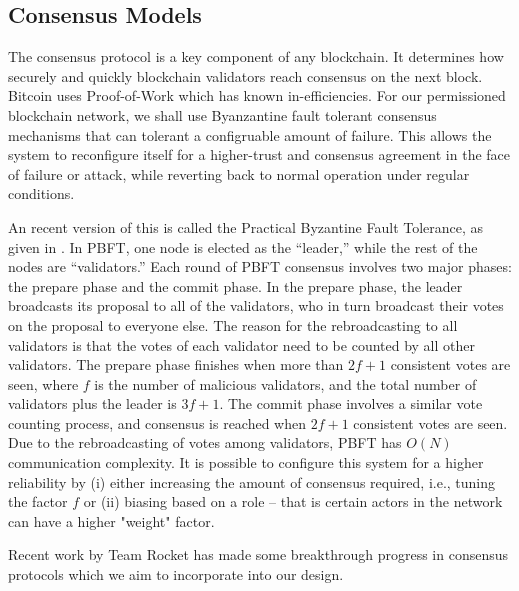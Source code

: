 \subsection{Consensus Models}

The consensus protocol is a key component of any blockchain. It determines how securely and
quickly blockchain validators reach consensus on the next block. Bitcoin uses Proof-of-Work which
has known in-efficiencies. For our permissioned blockchain network, we shall use Byanzantine fault tolerant 
consensus mechanisms that can tolerant a configruable amount of failure. This allows the system
to reconfigure itself for a higher-trust and consensus agreement in the face of failure or attack, while
reverting back to normal operation under regular conditions.

An recent version of this is called the Practical Byzantine Fault Tolerance, as given in \cite{castro1999}. In PBFT, one
node is elected as the “leader,” while the rest of the nodes are “validators.” Each round of PBFT consensus involves two
major phases: the prepare phase and the commit phase. In the prepare phase, the leader broadcasts its proposal to all of
the validators, who in turn broadcast their votes on the proposal to everyone else. The reason for the rebroadcasting to
all validators is that the votes of each validator need to be counted by all other validators. The prepare phase
finishes when more than $2f + 1$ consistent votes are seen, where $f$ is the number of malicious validators, and the
total number of validators plus the leader is $3f + 1$. The commit phase involves a similar vote counting process, and
consensus is reached when $2f + 1$ consistent votes are seen. Due to the rebroadcasting of votes among validators, PBFT
has $O(N)$ communication complexity. It is possible to configure this system for a higher reliability by (i) either
increasing the amount of consensus required, i.e., tuning the factor $f$ or (ii) biasing based on a role -- that is
certain actors in the network can have a higher "weight" factor.

Recent work by Team Rocket \cite{ava2018} has made some breakthrough progress in consensus protocols which we aim
to incorporate into our design.

